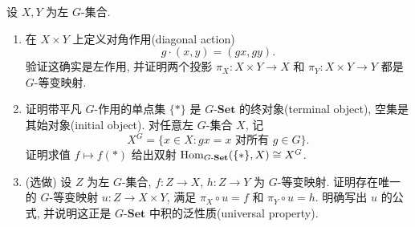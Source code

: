 \documentclass{article}
\begin{document}
\begin{problem}
  设 $X,Y$ 为左 $G$-集合.
  \begin{enumerate}
    \item[(a)] 在 $X\times Y$ 上定义对角作用(diagonal action)
      \[
        g\cdot(x,y)=(gx,gy).
      \]
      验证这确实是左作用, 并证明两个投影 $\pi_X:X\times Y\to X$ 和 $\pi_Y:X\times Y\to Y$ 都是 $G$-等变映射.
    \item[(b)] 证明带平凡 $G$-作用的单点集 $\{*\}$ 是 $G$-$\mathbf{Set}$ 的终对象(terminal object), 空集是其始对象(initial object). 对任意左 $G$-集合 $X$, 记
      \[
        X^G=\{x\in X:gx=x\text{ 对所有 }g\in G\}.
      \]
      证明求值 $f\mapsto f(*)$ 给出双射 $\operatorname{Hom}_{G\text{-}\mathbf{Set}}(\{*\},X)\cong X^G$.
    \item[(c)] (选做) 设 $Z$ 为左 $G$-集合, $f:Z\to X$, $h:Z\to Y$ 为 $G$-等变映射. 证明存在唯一的 $G$-等变映射 $u:Z\to X\times Y$, 满足 $\pi_X\circ u=f$ 和 $\pi_Y\circ u=h$. 明确写出 $u$ 的公式, 并说明这正是 $G$-$\mathbf{Set}$ 中积的泛性质(universal property).
  \end{enumerate}
\end{problem}
\end{document}
